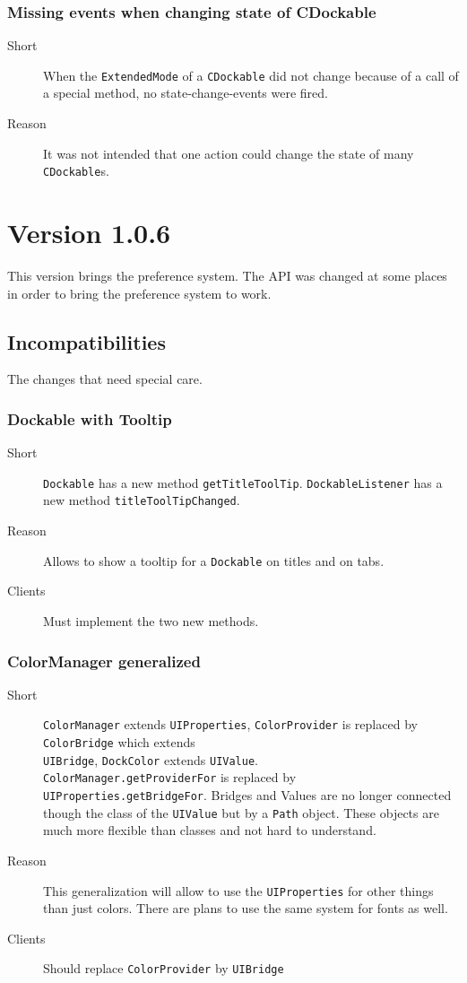 \documentclass[a4paper,10pt]{article}
\newcommand{\src}[1]{\lstinline[basicstyle=\normalsize\ttfamily,keywordstyle=\normalsize\ttfamily,identifierstyle=\normalsize\ttfamily]|#1|}
\newcommand{\short}{\item[Short]}
\newcommand{\why}{\item[Reason]}
\newcommand{\clients}{\item[Clients]}
\begin{document}
\subsubsection{Missing events when changing state of CDockable}
\begin{description}
 \short When the \src{ExtendedMode} of a \src{CDockable} did not change because of a call of a special method, no state-change-events were fired.
 \why It was not intended that one action could change the state of many \src{CDockable}s.
\end{description}

\section{Version 1.0.6}
This version brings the preference system. The API was changed at some places in order to bring the preference system to work.

\subsection{Incompatibilities}
The changes that need special care.

\subsubsection{Dockable with Tooltip}
\begin{description}
 \short \src{Dockable} has a new method \src{getTitleToolTip}. \src{DockableListener} has a new method \src{titleToolTipChanged}.
 \why Allows to show a tooltip for a \src{Dockable} on titles and on tabs.
 \clients Must implement the two new methods.
\end{description}

\subsubsection{ColorManager generalized}
\begin{description}
 \short \src{ColorManager} extends \src{UIProperties}, \src{ColorProvider} is replaced by \src{ColorBridge} which extends \\\src{UIBridge}, \src{DockColor} extends \src{UIValue}. \\\src{ColorManager.getProviderFor} is replaced by \\\src{UIProperties.getBridgeFor}. Bridges and Values are no longer connected though the class of the \src{UIValue} but by a \src{Path} object. These objects are much more flexible than classes and not hard to understand.
 \why This generalization will allow to use the \src{UIProperties} for other things than just colors. There are plans to use the same system for fonts as well.
 \clients Should replace \src{ColorProvider} by \src{UIBridge}
\end{description}
\end{document}
